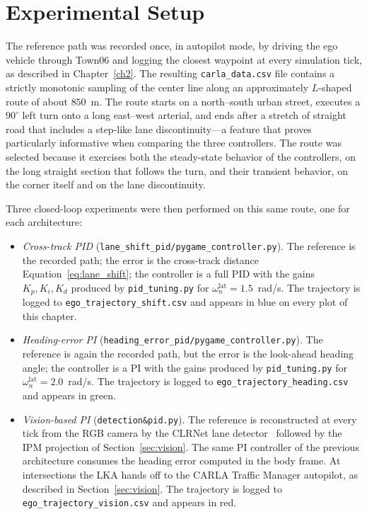 \section{Experimental Setup}
\label{sec:exp_setup}
The reference path was recorded once, in autopilot mode, by driving the ego vehicle through Town06 and logging the closest waypoint at every simulation tick, as described in Chapter~\ref{ch2}. The resulting \texttt{carla\_data.csv} file contains a strictly monotonic sampling of the center line along an approximately $L$-shaped route of about $850$~m. The route starts on a north--south urban street, executes a $90^\circ$ left turn onto a long east--west arterial, and ends after a stretch of straight road that includes a step-like lane discontinuity---a feature that proves particularly informative when comparing the three controllers. The route was selected because it exercises both the steady-state behavior of the controllers, on the long straight section that follows the turn, and their transient behavior, on the corner itself and on the lane discontinuity.

Three closed-loop experiments were then performed on this same route, one for each architecture:

\begin{itemize}
    \item \emph{Cross-track PID} (\texttt{lane\_shift\_pid/pygame\_controller.py}). The reference is the recorded path; the error is the cross-track distance Equation~\eqref{eq:lane_shift}; the controller is a full PID with the gains $K_p, K_i, K_d$ produced by \texttt{pid\_tuning.py} for $\omega_n^{\mathrm{lat}} = 1.5$~rad/s. The trajectory is logged to \texttt{ego\_trajectory\_shift.csv} and appears in blue on every plot of this chapter.
    \item \emph{Heading-error PI} (\texttt{heading\_error\_pid/pygame\_controller.py}). The reference is again the recorded path, but the error is the look-ahead heading angle; the controller is a PI with the gains produced by \texttt{pid\_tuning.py} for $\omega_n^{\mathrm{lat}} = 2.0$~rad/s. The trajectory is logged to \texttt{ego\_trajectory\_heading.csv} and appears in green.
    \item \emph{Vision-based PI} (\texttt{detection\&pid.py}). The reference is reconstructed at every tick from the RGB camera by the CLRNet lane detector~\cite{clrnet} followed by the \acs{IPM} projection of Section~\ref{sec:vision}. The same PI controller of the previous architecture consumes the heading error computed in the body frame. At intersections the \ac{LKA} hands off to the CARLA Traffic Manager autopilot, as described in Section~\ref{sec:vision}. The trajectory is logged to \texttt{ego\_trajectory\_vision.csv} and appears in red.
\end{itemize}

